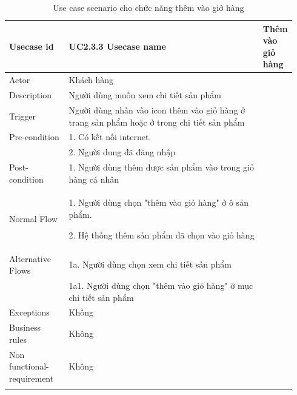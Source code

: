 
\begin{longtable}{|>{\hspace{0pt}}m{0.213\linewidth}|>{\hspace{0pt}}m{0.729\linewidth}|} 
\hline
Usecase id & UC2.3.3 \endfirsthead 
\hline
Usecase name & Thêm vào giỏ hàng \\ 
\hline
Actor & Khách hàng \\ 
\hline
Description & Người dùng muốn xem chi tiết sản phẩm \\ 
\hline
Trigger & Người dùng nhấn vào icon thêm vào giỏ hàng ở trang sản phẩm hoặc ở trong chi tiết sản phẩm \\ 
\hline
Pre-condition & 1. Có kết nối internet. \\
& 2. Người dung đã đăng nhập\\ 
\hline
Post-condition & 1. Người dùng thêm được sản phẩm vào trong giỏ hàng cá nhân \\ 
\hline
Normal Flow & 1. Người dùng chọn "thêm vào giỏ hàng" ở ô sản phẩm.\par{}2. Hệ thống thêm sản phẩm đã chọn vào giỏ hàng \\ 
\hline
Alternative Flows & 1a. Người dùng chọn xem chi tiết sản phẩm \\ 
& 1a1. Người dùng chọn "thêm vào giỏ hàng" ở mục chi tiết sản phẩm \\
\hline
Exceptions & Không \\ 
\hline
Business rules & Không \\ 
\hline
Non functional-requirement & Không \\ 
\hline
\caption{Use case scenario cho chức năng thêm vào giở hàng}
\end{longtable}

